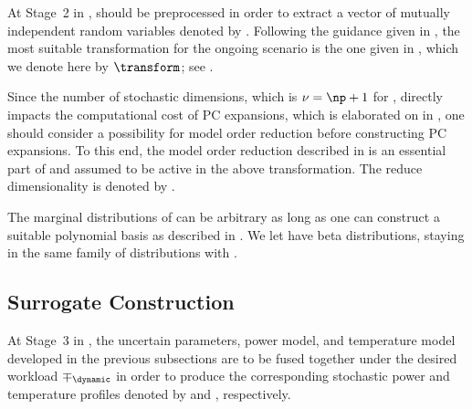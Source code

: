 At Stage~2 in , \vu should be preprocessed in order to
extract a vector of mutually independent random variables denoted by \vz.
Following the guidance given in , the most suitable
transformation for the ongoing scenario is the one given in
, which we denote here by $\transform$; see
.

Since the number of stochastic dimensions, which is $\nu = \np + 1$ for \vu,
directly impacts the computational cost of \ac{PC} expansions, which is
elaborated on in , one should consider a possibility
for model order reduction before constructing \ac{PC} expansions. To this end,
the model order reduction described in  is an
essential part of and assumed to be active in the above transformation. The
reduce dimensionality is denoted by \nz.

The marginal distributions of \vz can be arbitrary as long as one can construct
a suitable polynomial basis as described in . We let
\vz have beta distributions, staying in the same family of distributions with
\vu.

\subsection{Surrogate Construction}

At Stage~3 in , the uncertain parameters, power model, and
temperature model developed in the previous subsections are to be fused together
under the desired workload $\mp_\dynamic$ in order to produce the corresponding
stochastic power and temperature profiles denoted by \mp and \mq, respectively.

